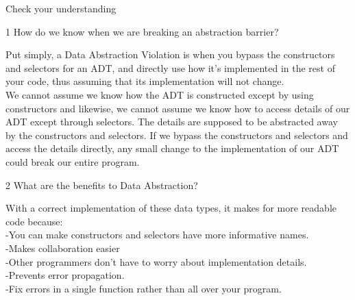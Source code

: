 \question 
Check your understanding
\begin{paragraph}
1 How do we know when we are breaking an abstraction barrier? 
\end{paragraph}
\begin{solution}
Put simply, a Data Abstraction Violation is when you bypass the constructors and selectors for an ADT, and directly use how it’s implemented in the rest of your code, thus assuming that its implementation will not change. \\ 
We cannot assume we know how the ADT is constructed except by using constructors and likewise, we cannot assume we know how to access details of our ADT except through selectors. The details are supposed to be abstracted away by the constructors and selectors. If we bypass the constructors and selectors and access the details directly, any small change to the implementation of our ADT could break our entire program.
\end{solution}
\begin{paragraph}
2 What are the benefits to Data Abstraction? 
\end{paragraph}
\begin{solution}
With a correct implementation of these data types, it makes for more readable code because: \\ 
-You can make constructors and selectors have more informative names. \\ 
-Makes collaboration easier \\ 
-Other programmers don't have to worry about implementation details. \\ 
-Prevents error propagation. \\
-Fix errors in a single function rather than all over your program.

\end{solution}